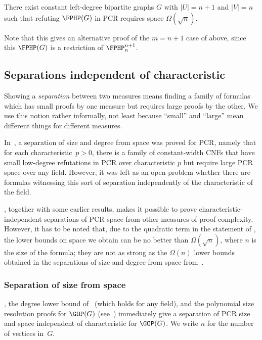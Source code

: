 \documentclass{toc}
\begin{document}
\begin{corollary}
There exist constant left-degree bipartite graphs $G$ with $|U| = n+1$  and $|V| =n$ such that
refuting $\FPHP(G)$ in PCR requires space $\Omega(\sqrt{n})$.
\end{corollary}

Note that this gives an alternative proof of the $m=n+1$ case of  above, 
since this $\FPHP(G)$ is a restriction of $\FPHP^{n+1}_n$.

\subsection{Separations independent of characteristic}

Showing a \emph{separation} between two measures means
finding a family of formulas which
has small proofs by one measure but requires large
proofs by the other. We use this notion rather informally,
not least because ``small'' and ``large'' mean different things
for different measures.

In~\cite{DBLP:conf/icalp/FilmusLMNV13}, a separation of size and degree from space was proved for PCR, namely that
for each characteristic~$p>0$, there is a family of constant-width CNFs that have small low-degree refutations in PCR over characteristic $p$ but require large PCR space over any field. However, it was left as an open problem whether there are formulas witnessing this sort of separation 
independently of the characteristic of the field.

, together with some earlier results, makes it possible to prove characteristic-independent separations of PCR space from other measures of proof complexity. However, it has to be noted that, due to the quadratic term in the statement of , the 
lower bounds on space we obtain can be no better than $\Omega(\sqrt{n})$, where $n$ is the size of the formula;  they are not as strong as the
$\Omega(n)$ lower bounds obtained in the separations of size and degree from space from~\cite{DBLP:conf/icalp/FilmusLMNV13}.



\subsubsection{Separation of size from space}



, the degree lower bound of~\cite{DBLP:journals/tocl/GalesiL10} 
(which holds for any field), and the polynomial size resolution proofs for $\GOP(G)$ 
(see~\cite{DBLP:journals/tocl/GalesiL10}) immediately give a separation of PCR size and space
independent of characteristic for $\GOP(G)$.  We write $n$ for the number of vertices in~$G$.
\end{document}
